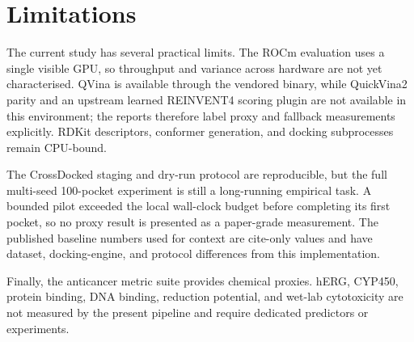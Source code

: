 \section{Limitations}
\label{sec:limitations}

The current study has several practical limits.  The ROCm evaluation uses a
single visible GPU, so throughput and variance across hardware are not yet
characterised.  QVina is available through the vendored binary, while
QuickVina2 parity and an upstream learned REINVENT4 scoring plugin are not
available in this environment; the reports therefore label proxy and
fallback measurements explicitly.  RDKit descriptors, conformer generation,
and docking subprocesses remain CPU-bound.

The CrossDocked staging and dry-run protocol are reproducible, but the full
multi-seed 100-pocket experiment is still a long-running empirical task.  A
bounded pilot exceeded the local wall-clock budget before completing its first
pocket, so no proxy result is presented as a paper-grade measurement.  The
published baseline numbers used for context are cite-only values and have
dataset, docking-engine, and protocol differences from this implementation.

Finally, the anticancer metric suite provides chemical proxies.  hERG,
CYP450, protein binding, DNA binding, reduction potential, and wet-lab
cytotoxicity are not measured by the present pipeline and require dedicated
predictors or experiments.
